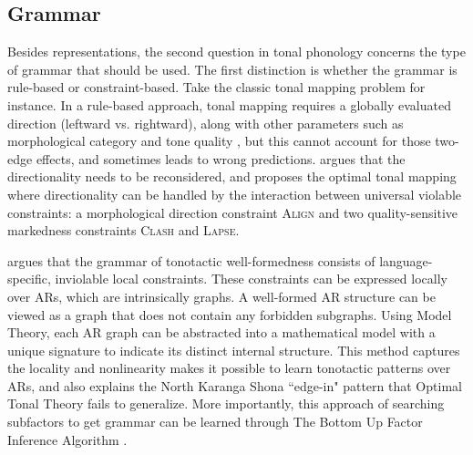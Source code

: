 \subsection{Grammar}

Besides representations, the second question in tonal phonology concerns the type of grammar that should be used. The first distinction is whether the grammar is rule-based or constraint-based. Take the classic tonal mapping problem for instance. In a rule-based approach, tonal mapping requires a globally evaluated direction (leftward vs. rightward), along with other parameters such as morphological category and tone quality \citep{goldsmith1976autosegmental}, but this cannot account for those two-edge effects, and sometimes leads to wrong predictions. \citet{zoll2003optimal} argues that the directionality needs to be reconsidered, and proposes the optimal tonal mapping where directionality can be handled by the interaction between universal violable constraints: a morphological direction constraint \textsc{Align} and two quality-sensitive markedness constraints \textsc{Clash} and \textsc{Lapse}.

\citet{jardine2017LocalNature} argues that the grammar of tonotactic well-formedness consists of language-specific, inviolable local constraints. These constraints can be expressed locally over ARs, which are intrinsically graphs. A well-formed AR structure can be viewed as a graph that does not contain any forbidden subgraphs. Using Model Theory, each AR graph can be abstracted into a mathematical model with a unique signature to indicate its distinct internal structure. This method captures the locality and nonlinearity makes it possible to learn tonotactic patterns over ARs, and also explains the North Karanga Shona ``edge-in" pattern that Optimal Tonal Theory fails to generalize.
More importantly, this approach of searching subfactors to get grammar can be learned through The Bottom Up Factor Inference  Algorithm \citep[BUFIA,][]{chandleeBufia2019}. 
